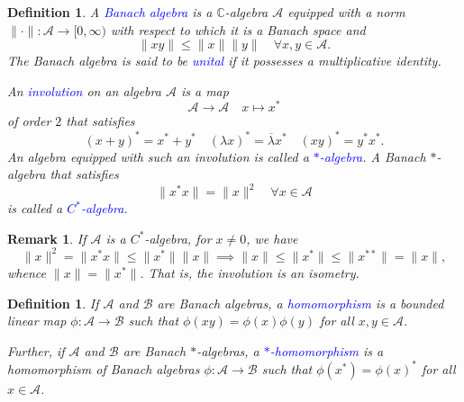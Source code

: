 \documentclass[12pt]{article}
\theoremstyle{thmstyle}
\theoremstyle{defstyle}
\newtheorem{definition}[theorem]{Definition}
\newtheorem{remark}[theorem]{Remark}
\newcommand{\bbC}{\mathbb{C}}
\newcommand{\calA}{\mathcal{A}} %
\newcommand{\calB}{\mathcal{B}} %
\newcommand{\define}[1]{\textcolor{blue}{\textit{#1}}}
\renewcommand{\le}{\leqslant}
\begin{document}
\begin{definition}
    A \define{Banach algebra} is a $\bbC$-algebra $\calA$ equipped with a norm $\|\cdot\|:\calA\to[0,\infty)$ with respect to which it is a Banach space and 
    \begin{equation*}
        \|xy\|\le\|x\|\|y\|\quad\forall x,y\in\calA.
    \end{equation*}
    The Banach algebra is said to be \define{unital} if it possesses a multiplicative identity.

    An \define{involution} on an algebra $\calA$ is a map 
    \begin{equation*}
        \calA\to\calA\quad x\mapsto x^\ast
    \end{equation*}
    of order $2$ that satisfies 
    \begin{equation*}
        (x + y)^\ast = x^\ast + y^\ast\quad(\lambda x)^\ast = \overline\lambda x^\ast\quad (xy)^\ast = y^\ast x^\ast.
    \end{equation*}
    An algebra equipped with such an involution is called a \define{$\ast$-algebra}. A Banach $\ast$-algebra that satisfies 
    \begin{equation*}
        \|x^\ast x\| = \|x\|^2 \quad \forall x\in\calA
    \end{equation*}
    is called a \define{$C^\ast$-algebra}.
\end{definition}

\begin{remark}
    If $\calA$ is a $C^\ast$-algebra, for $x\ne 0$, we have 
    \begin{equation*}
        \|x\|^2 = \|x^\ast x\|\le\|x^\ast\|\|x\|\implies\|x\|\le\|x^\ast\|\le\|x^{\ast\ast}\| = \|x\|,
    \end{equation*}
    whence $\|x\| = \|x^\ast\|$. That is, the involution is an isometry.
\end{remark}

\begin{definition}
    If $\calA$ and $\calB$ are Banach algebras, a \define{homomorphism} is a bounded linear map $\phi:\calA\to\calB$ such that $\phi(xy) = \phi(x)\phi(y)$ for all $x,y\in\calA$.

    Further, if $\calA$ and $\calB$ are Banach $\ast$-algebras, a \define{$\ast$-homomorphism} is a homomorphism of Banach algebras $\phi:\calA\to\calB$ such that $\phi(x^\ast) = \phi(x)^\ast$ for all $x\in\calA$.
\end{definition}
\end{document}
